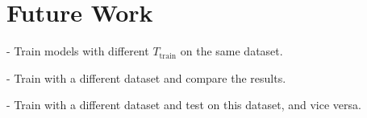 \documentclass[12pt]{article}
\begin{document}





\section{Future Work}


- Train models with different $T_{\text{train}}$ on the same dataset.

- Train with a different dataset and compare the results.

- Train with a different dataset and test on this dataset, and vice versa.
\end{document}
